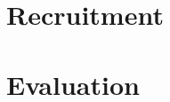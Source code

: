 \documentclass[11pt]{NSFamsart}
\begin{document}
\section{Recruitment}
\section{Evaluation}


\newpage
\clearpage
\setcounter{page}{1}



{\renewcommand\addcontentsline[3]{} 
\renewcommand{\refname}{{\Large\textbf{References Cited}}}                   %
\renewcommand{\bibliofont}{\normalsize}

}
\end{document}
